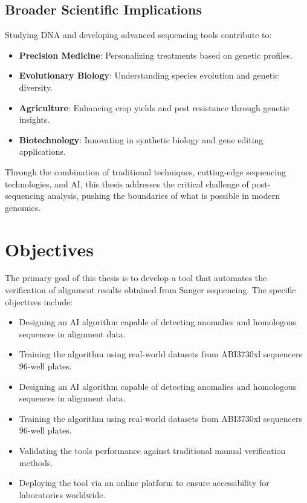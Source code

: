 \subsection{Broader Scientific Implications}
Studying DNA and developing advanced sequencing tools contribute to:
\begin{itemize}
\item \textbf{Precision Medicine}: Personalizing treatments based on genetic profiles.
\item \textbf{Evolutionary Biology}: Understanding species evolution and genetic diversity.
\item \textbf{Agriculture}: Enhancing crop yields and pest resistance through genetic insights.
\item \textbf{Biotechnology}: Innovating in synthetic biology and gene editing applications.
\end{itemize}

Through the combination of traditional techniques, cutting-edge sequencing technologies, and AI, this thesis addresses the critical challenge of post-sequencing analysis, pushing the boundaries of what is possible in modern genomics.

\section{Objectives}
\label{sec:Objectives}

The primary goal of this thesis is to develop a tool that automates the verification of alignment results obtained from Sanger sequencing. The specific objectives include:

\begin{itemize}
  \item Designing an AI algorithm capable of detecting anomalies and homologous sequences in alignment data.
  \item Training the algorithm using real-world datasets from ABI3730xl sequencers 96-well plates.
  \item Designing an AI algorithm capable of detecting anomalies and homologous sequences in alignment data.
  \item Training the algorithm using real-world datasets from ABI3730xl sequencers 96-well plates.
  \item Validating the tools performance against traditional manual verification methods.
  \item Deploying the tool via an online platform to ensure accessibility for laboratories worldwide.
\end{itemize}

